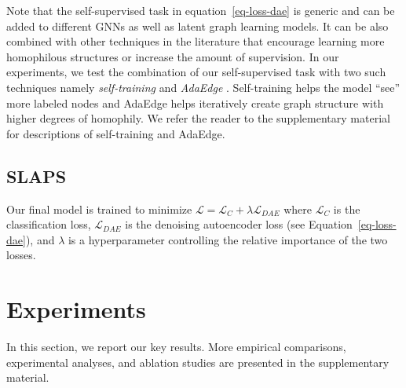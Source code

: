\documentclass{article}
\def\eqref#1{equation~\ref{#1}}
\def\Eqref#1{Equation~\ref{#1}}
\newcommand{\loss}[1]{\ensuremath{\mathcal{#1}}}
\begin{document}
Note that the self-supervised task in \eqref{eq-loss-dae} is generic and can be added to different GNNs as well as latent graph learning models. It can be also combined with other techniques in the literature that encourage learning more homophilous structures or increase the amount of supervision. In our experiments, we test the combination of our self-supervised task with two such techniques namely \emph{self-training} \cite{li2018deeper} and \emph{AdaEdge} \cite{chen2020measuring}. Self-training helps the model ``see'' more labeled nodes and AdaEdge helps iteratively create graph structure with higher degrees of homophily. We refer the reader to the supplementary material for descriptions of self-training and AdaEdge.

\subsection{SLAPS} \label{sec:slaps}
Our final model is trained to minimize $\loss{L}=\loss{L}_C + \lambda \loss{L}_{DAE}$ where $\loss{L}_C$ is the classification loss, $\loss{L}_{DAE}$ is the denoising autoencoder loss (see \Eqref{eq-loss-dae}), and $\lambda$ is a hyperparameter controlling the relative importance of the two losses.

\section{Experiments}\label{sec:experiments}

In this section, we report our key results. More empirical comparisons, experimental analyses, and ablation studies are presented in the supplementary material.
\end{document}
